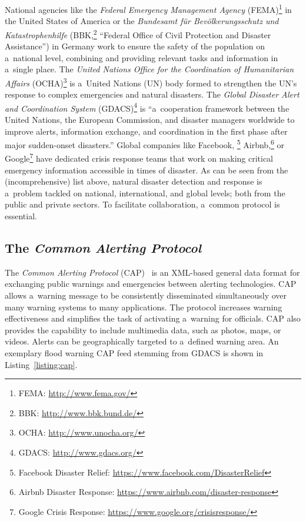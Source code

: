 \documentclass[letterpaper]{article}
\begin{document}
National agencies like the
\emph{Federal Emergency Management Agency}
(FEMA)\footnote{FEMA: \url{http://www.fema.gov/}}
in the United States of America or the
\emph{Bundesamt für Bevölkerungsschutz und Katastrophenhilfe}
(BBK,\footnote{BBK: \url{http://www.bbk.bund.de/}}
``Federal Office of Civil Protection and Disaster Assistance'')
in Germany work to ensure the safety of the population
on a~national level, combining and providing relevant tasks
and information in a~single place.
The \emph{United Nations Office for the Coordination of Humanitarian Affairs}
(OCHA)\footnote{OCHA: \url{http://www.unocha.org/}}
is a~United Nations (UN) body formed to strengthen the UN's response
to complex emergencies and natural disasters.
The \emph{Global Disaster Alert and Coordination System}
(GDACS)\footnote{GDACS: \url{http://www.gdacs.org/}}
is ``a~cooperation framework between the United Nations,
the European Commission, and disaster managers worldwide
to improve alerts, information exchange, and coordination
in the first phase after major sudden-onset disasters.''
Global companies like Facebook,%
\footnote{Facebook Disaster Relief:
\url{https://www.facebook.com/DisasterRelief}}
Airbnb,\footnote{Airbnb Disaster Response:
\url{https://www.airbnb.com/disaster-response}} or
Google\footnote{Google Crisis Response:
\url{https://www.google.org/crisisresponse/}}
have dedicated crisis response teams that work on
making critical emergency information accessible in times of disaster.
As can be seen from the (incomprehensive) list above,
natural disaster detection and response is a~problem
tackled on national, international, and global levels;
both from the public and private sectors.
To facilitate collaboration, a~common protocol is essential.

\subsection{The \emph{Common Alerting Protocol}}

The \emph{Common Alerting Protocol} (CAP)~\cite{westfall2010cap}
is an XML-based general data format for exchanging public warnings
and emergencies between alerting technologies.
CAP allows a~warning message to be consistently disseminated simultaneously
over many warning systems to many applications.
The protocol increases warning effectiveness and
simplifies the task of activating a~warning for officials.
CAP also provides the capability to include multimedia data,
such as photos, maps, or videos.
Alerts can be geographically targeted to a~defined warning area.
An exemplary flood warning CAP feed stemming from GDACS is shown in
Listing~\ref{listing:cap}.
\end{document}
